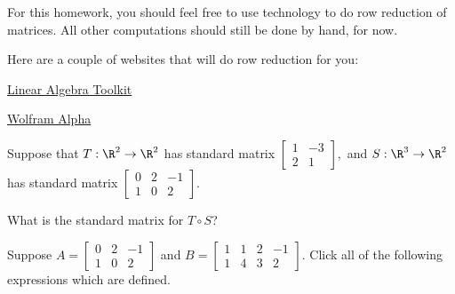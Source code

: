 




For this homework, you should feel free to use technology to do row reduction of matrices.  All other
computations should still be done by hand, for now.  

Here are a couple of websites that will do row reduction for you:

\href{https://tinyurl.com/dmokjt}{Linear Algebra Toolkit}

\href{https://www.wolframalpha.com/}{Wolfram Alpha}




\endedxtext


\endedxvertical




Suppose that $T: \R^2 \rightarrow \R^2$ has standard matrix 
$\left[ 
\begin{array}{cc} 1& -3 \\ 2 & 1 \end{array} \right],$
and $S: \R^3 \rightarrow \R^2$ has standard matrix
$\left[ 
\begin{array}{ccc} 0& 2 &  -1 \\ 1 & 0 & 2 \end{array} \right].$

What is the standard matrix for $T\circ S$?  

 






\endedxproblem


Suppose $A = \left[ 
\begin{array}{ccc} 0& 2 &  -1 \\ 1 & 0 & 2 \end{array} \right]$ and $B = \left[ 
\begin{array}{cccc} 1&  1& 2 &  -1 \\ 1 & 4 & 3 & 2 \end{array} \right].$
Click all of the following expressions which are defined.

